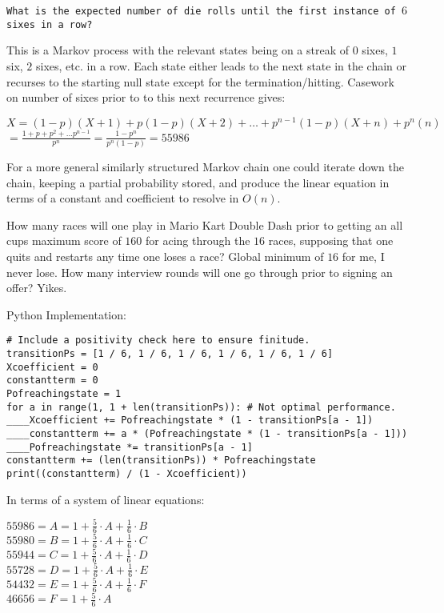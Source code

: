 \texttt{What is the expected number of die rolls until the first instance of $6$ sixes in a row?}

This is a Markov process with the relevant states being on a streak of $0$ sixes, $1$ six, $2$ sixes, etc. in a row. Each state either leads to the next state in the chain or recurses to the starting null state except for the termination/hitting. Casework on number of sixes prior to to this next recurrence gives:

$X = (1-p)(X+1)+p(1-p)(X+2)+\dots+p^{n-1}(1-p)(X+n)+p^n(n)$ \\
$= \frac{1+p+p^2+\dots p^{n-1}}{p^n} = \frac{1-p^n}{p^n (1-p)} = \boxed{55986}$

For a more general similarly structured Markov chain one could iterate down the chain, keeping a partial probability stored, and produce the linear equation in terms of a constant and coefficient to resolve in $O(n)$.

How many races will one play in Mario Kart Double Dash prior to getting an all cups maximum score of $160$ for acing through the $16$ races, supposing that one quits and restarts any time one loses a race? Global minimum of $16$ for me, I never lose. How many interview rounds will one go through prior to signing an offer? Yikes.

Python Implementation:

\begin{verbatim}
# Include a positivity check here to ensure finitude.
transitionPs = [1 / 6, 1 / 6, 1 / 6, 1 / 6, 1 / 6, 1 / 6]
Xcoefficient = 0
constantterm = 0
Pofreachingstate = 1
for a in range(1, 1 + len(transitionPs)): # Not optimal performance.
____Xcoefficient += Pofreachingstate * (1 - transitionPs[a - 1])
____constantterm += a * (Pofreachingstate * (1 - transitionPs[a - 1]))
____Pofreachingstate *= transitionPs[a - 1]
constantterm += (len(transitionPs)) * Pofreachingstate
print((constantterm) / (1 - Xcoefficient))
\end{verbatim}

In terms of a system of linear equations:

$55986 = A = 1+\frac{5}{6} \cdot A+\frac{1}{6} \cdot B$ \\
$55980 = B = 1+\frac{5}{6} \cdot A+\frac{1}{6} \cdot C$ \\
$55944 = C = 1+\frac{5}{6} \cdot A+\frac{1}{6} \cdot D$ \\
$55728 = D = 1+\frac{5}{6} \cdot A+\frac{1}{6} \cdot E$ \\
$54432 = E = 1+\frac{5}{6} \cdot A+\frac{1}{6} \cdot F$ \\
$46656 = F = 1+\frac{5}{6} \cdot A$

